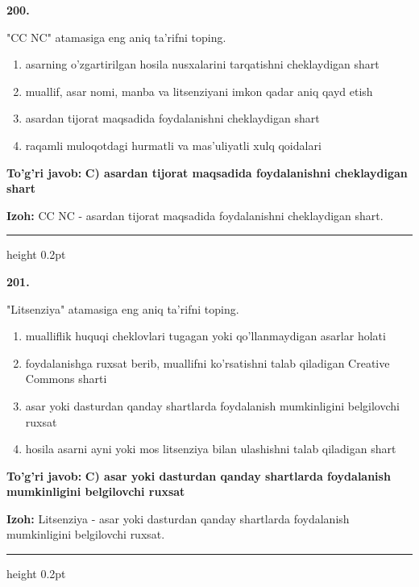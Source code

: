 \documentclass[10pt,a4paper,oneside]{article}
\begin{document}
\noindent\textbf{\color{ink}200.}
\par
"CC NC" atamasiga eng aniq ta'rifni toping.
\begin{enumerate}[label=\Alph*),leftmargin=9mm]
\item asarning o'zgartirilgan hosila nusxalarini tarqatishni cheklaydigan shart
\item muallif, asar nomi, manba va litsenziyani imkon qadar aniq qayd etish
\item asardan tijorat maqsadida foydalanishni cheklaydigan shart
\item raqamli muloqotdagi hurmatli va mas'uliyatli xulq qoidalari
\end{enumerate}
\begin{tcolorbox}[enhanced,breakable,colback=teal!4,colframe=teal!50!black,boxrule=0.5pt,arc=1.1mm,left=3mm,right=3mm,top=1.7mm,bottom=1.7mm,before skip=2mm,after skip=2mm]
\textbf{\color{teal}To'g'ri javob:} \textbf{C) asardan tijorat maqsadida foydalanishni cheklaydigan shart}
\par\smallskip
\textbf{Izoh:} CC NC - asardan tijorat maqsadida foydalanishni cheklaydigan shart.
\end{tcolorbox}
\vspace{2mm}\hrule height 0.2pt \vspace{3mm}

\noindent\textbf{\color{ink}201.}
\par
"Litsenziya" atamasiga eng aniq ta'rifni toping.
\begin{enumerate}[label=\Alph*),leftmargin=9mm]
\item mualliflik huquqi cheklovlari tugagan yoki qo'llanmaydigan asarlar holati
\item foydalanishga ruxsat berib, muallifni ko'rsatishni talab qiladigan Creative Commons sharti
\item asar yoki dasturdan qanday shartlarda foydalanish mumkinligini belgilovchi ruxsat
\item hosila asarni ayni yoki mos litsenziya bilan ulashishni talab qiladigan shart
\end{enumerate}
\begin{tcolorbox}[enhanced,breakable,colback=teal!4,colframe=teal!50!black,boxrule=0.5pt,arc=1.1mm,left=3mm,right=3mm,top=1.7mm,bottom=1.7mm,before skip=2mm,after skip=2mm]
\textbf{\color{teal}To'g'ri javob:} \textbf{C) asar yoki dasturdan qanday shartlarda foydalanish mumkinligini belgilovchi ruxsat}
\par\smallskip
\textbf{Izoh:} Litsenziya - asar yoki dasturdan qanday shartlarda foydalanish mumkinligini belgilovchi ruxsat.
\end{tcolorbox}
\vspace{2mm}\hrule height 0.2pt \vspace{3mm}
\end{document}

